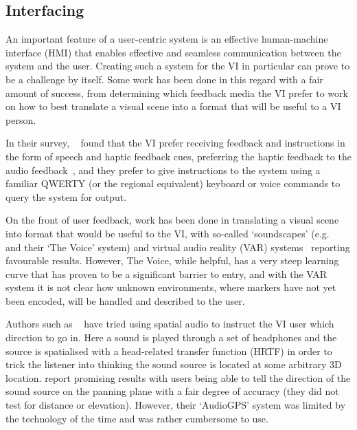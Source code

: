 \documentclass[format=sigconf, review=true, screen=true, anonymous=true]{acmart}
\begin{document}
\subsection{Interfacing}

An important feature of a user-centric system is an effective human-machine interface (HMI) that enables effective and seamless communication between the system and the user. Creating such a system for the VI in particular can prove to be a challenge by itself. Some work has been done in this regard with a fair amount of success, from determining which feedback media the VI prefer to work on how to best translate a visual scene into a format that will be useful to a VI person. 

In their survey, \citeauthor{khoo2016multimodal}~\cite{khoo2016multimodal} found that the VI prefer receiving feedback and instructions in the form of speech and haptic feedback cues, preferring the haptic feedback to the audio feedback~\cite{ross2000wearable}, and they prefer to give instructions to the system using a familiar QWERTY (or the regional equivalent) keyboard or voice commands to query the system for output. 

On the front of user feedback, work has been done in translating a visual scene into format that would be useful to the VI, with so-called `soundscapes' (e.g. \citeauthor{meijer2010}~\cite{meijer2010} and their `The Voice' system) and virtual audio reality (VAR) systems~\cite{frauenberger2003} reporting favourable results. However, The Voice, while helpful, has a very steep learning curve that has proven to be a significant barrier to entry, and with the VAR system it is not clear how unknown environments, where markers have not yet been encoded, will be handled and described to the user. 

Authors such as \citeauthor{holland2002audiogps}~\cite{holland2002audiogps} have tried using spatial audio to instruct the VI user which direction to go in. Here a sound is played through a set of headphones and the source is spatialised with a head-related transfer function (HRTF) in order to trick the listener into thinking the sound source is located at some arbitrary 3D location. \citeauthor{holland2002audiogps} report promising results with users being able to tell the direction of the sound source on the panning plane with a fair degree of accuracy (they did not test for distance or elevation). However, their `AudioGPS' system was limited by the technology of the time and was rather cumbersome to use. 
\end{document}
